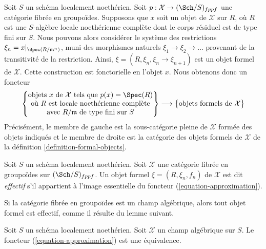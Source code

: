 \noindent
Soit $S$ un schéma localement noethérien. Soit
$p : \mathcal{X} \to (\Sch/S)_{fppf}$ une catégorie fibrée en groupoïdes.
Supposons que $x$ soit un objet de $\mathcal{X}$ sur $R$, où $R$ est une
$S$-algèbre locale noethérienne complète dont le corps résiduel est de type
fini sur $S$. Nous pouvons alors considérer le système des restrictions
$\xi_n = x|_{\Spec(R/\mathfrak m^n)}$, muni des morphismes naturels
$\xi_1 \to \xi_2 \to \ldots$ provenant de la transitivité de la restriction.
Ainsi, $\xi = (R, \xi_n, \xi_n \to \xi_{n + 1})$ est un objet formel de
$\mathcal{X}$. Cette construction est fonctorielle en l'objet $x$.
Nous obtenons donc un foncteur
\begin{equation}
\label{equation-approximation}
\left\{
\begin{matrix}
\text{objets }x\text{ de }\mathcal{X} \text{ tels que }p(x) = \Spec(R) \\
\text{où }R\text{ est locale noethérienne complète}\\
\text{avec }R/\mathfrak m\text{ de type fini sur }S
\end{matrix}
\right\}
\longrightarrow
\left\{
\begin{matrix}
\text{objets formels de }\mathcal{X}
\end{matrix}
\right\}
\end{equation}
Précisément, le membre de gauche est la sous-catégorie pleine de
$\mathcal{X}$ formée des objets indiqués et le membre de droite est la
catégorie des objets formels de $\mathcal{X}$ de la définition
\ref{definition-formal-objects}.

\begin{definition}
\label{definition-effective}
Soit $S$ un schéma localement noethérien. Soit $\mathcal{X}$ une catégorie
fibrée en groupoïdes sur $(\Sch/S)_{fppf}$. Un objet formel
$\xi = (R, \xi_n, f_n)$ de $\mathcal{X}$ est dit {\it effectif} s'il
appartient à l'image essentielle du foncteur
(\ref{equation-approximation}).
\end{definition}

\noindent
Si la catégorie fibrée en groupoïdes est un champ algébrique, alors tout
objet formel est effectif, comme il résulte du lemme suivant.

\begin{lemma}
\label{lemma-effective}
Soit $S$ un schéma localement noethérien. Soit $\mathcal{X}$ un champ
algébrique sur $S$. Le foncteur (\ref{equation-approximation}) est une
équivalence.
\end{lemma}

